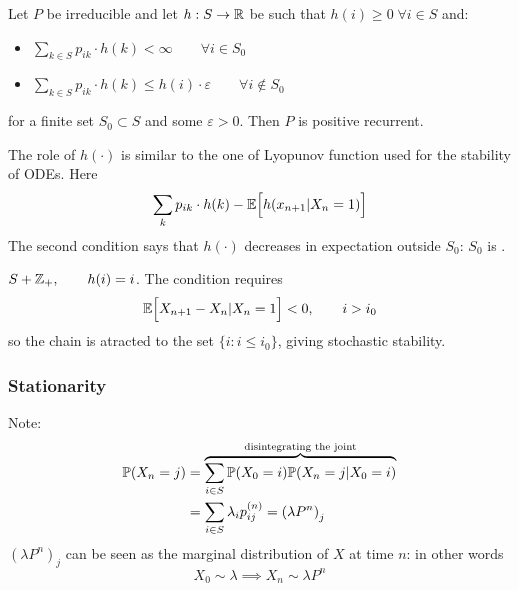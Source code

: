 \documentclass{article}
\begin{document}
\begin{proposition}
    Let $P$ be irreducible and let $h:S\rightarrow\mathbb{R}$ be such that $h(i)\geqslant0 \;\forall i \in S$ and:
    \begin{itemize}
        \item $\sum_{k\in S} p_{ik} \cdot h(k)<\infty\qquad\forall i \in S_0$
        \item $\sum_{k\in S} p_{ik} \cdot h(k)\leqslant h(i)\cdot \varepsilon\qquad\forall i \notin S_0$
    \end{itemize}
    for a finite set $S_0 \subset S$ and some $\varepsilon>0$. Then $P$ is positive recurrent.
\end{proposition}
The role of $h(\cdot)$ is similar to the one of Lyopunov function used for the stability of ODEs. Here
\[\sum_{k} p_{ik} \cdot h(k)-\mathbb{E}\Bigl[{h(x_{n+1}|X_n=1)}\Bigr]\]
The second condition says that $h(\cdot)$ decreases in expectation outside $S_0$: $S_0$ is .
\begin{example}
    $S+\mathbb{Z}_+, \qquad h(i)=i$. The condition requires
    \[\mathbb{E}\Bigl[{X_{n+1}-X_{n}|X_n=1}\Bigr]<0, \qquad i>i_0\]
    so the chain is atracted to the set $\{i:i\leqslant i_0\}$, giving stochastic stability.
\end{example}
\subsubsection{Stationarity}
Note:
\begin{align*}
    \prob(X_n=j) &= \overbrace{\sum_{i\in S}\prob(X_0=i)\prob(X_n=j|X_0=i) }^{\mathclap{\text{disintegrating the joint}}}\\
    &=\sum_{i\in S}\lambda_i p_{ij}^{(n)}=\left(\lambda P^n\right)_j
\end{align*}
$\left(\lambda P^n\right)_j$ can be seen as the marginal distribution of $X$ at time $n$: in other words
\[X_0\sim \lambda\implies X_n\sim\lambda P^n\]
\end{document}
